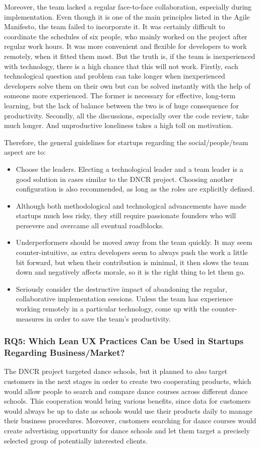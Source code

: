 \documentclass{article}
\begin{document}
Moreover, the team lacked a regular face-to-face collaboration, especially during implementation. Even though it is one of the main principles listed in the Agile Manifesto, the team failed to incorporate it. It was certainly difficult to coordinate the schedules of six people, who mainly worked on the project after regular work hours. It was more convenient and flexible for developers to work remotely, when it fitted them most. But the truth is, if the team is inexperienced with technology, there is a high chance that this will not work. Firstly, each technological question and problem can take longer when inexperienced developers solve them on their own but can be solved instantly with the help of someone more experienced. The former is necessary for effective, long-term learning, but the lack of balance between the two is of huge consequence for productivity. Secondly, all the discussions, especially over the code review, take much longer. And unproductive loneliness takes a high toll on motivation.

Therefore, the general guidelines for startups regarding the social/people/team aspect are to:
\begin{itemize}
\item Choose the leaders. Electing a technological leader and a team leader is a good solution in cases similar to the DNCR project. Choosing another configuration is also recommended, as long as the roles are explicitly defined.
\item Although both methodological and technological advancements have made startups much less risky, they still require passionate founders who will persevere and overcame all eventual roadblocks.
\item Underperformers should be moved away from the team quickly. It may seem counter-intuitive, as extra developers seem to always push the work a little bit forward, but when their contribution is minimal, it then slows the team down and negatively affects morale, so it is the right thing to let them go.
\item Seriously consider the destructive impact of abandoning the regular, collaborative implementation sessions. Unless the team has experience working remotely in a particular technology, come up with the counter-measures in order to save the team's productivity.
\end{itemize}

\subsubsection{RQ5: Which Lean UX Practices Can be Used in Startups Regarding Business/Market?}
The DNCR project targeted dance schools, but it planned to also target customers in the next stages in order to create two cooperating products, which would allow people to search and compare dance courses across different dance schools. This cooperation would bring various benefits, since data for customers would always be up to date as schools would use their products daily to manage their business procedures. Moreover, customers searching for dance courses would create advertising opportunity for dance schools and let them target a precisely selected group of potentially interested clients.
\end{document}
